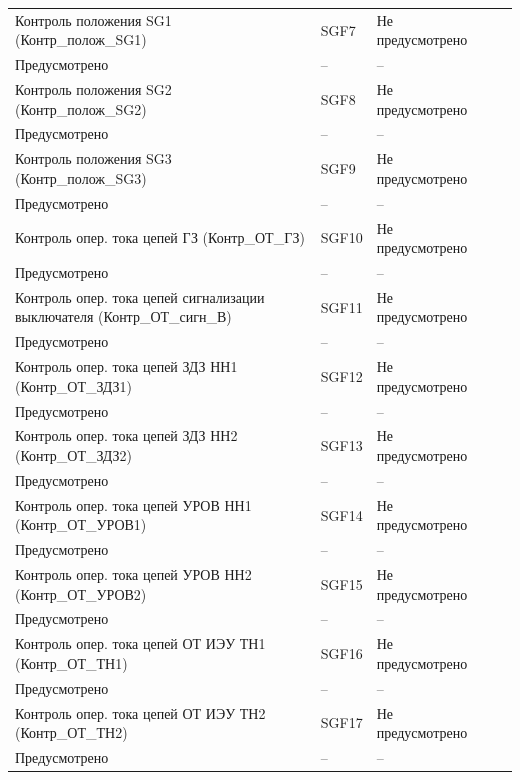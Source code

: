 \begin{longtable}{|>{\centering\arraybackslash}m{5.3cm}|>{\centering\arraybackslash}m{3.3cm}|>{\centering\arraybackslash}m{4.2cm}|>{\centering\arraybackslash}m{1.8cm}|>{\centering\arraybackslash}m{1cm}|}
\hline
\centering Контроль положения SG1 (Контр\_полож\_SG1)  & \centering SGF7 & \centering Не предусмотрено \\ Предусмотрено & \centering -- & \centering \arraybackslash -- \\
\hline
\centering Контроль положения SG2 (Контр\_полож\_SG2)  & \centering SGF8 & \centering Не предусмотрено \\ Предусмотрено & \centering -- & \centering \arraybackslash -- \\
\hline
\centering Контроль положения SG3 (Контр\_полож\_SG3)  & \centering SGF9 & \centering Не предусмотрено \\ Предусмотрено & \centering -- & \centering \arraybackslash -- \\
\hline
\centering Контроль опер. тока цепей ГЗ (Контр\_ОТ\_ГЗ)  & \centering SGF10 & \centering Не предусмотрено \\ Предусмотрено & \centering -- & \centering \arraybackslash -- \\
\hline
\centering Контроль опер. тока цепей сигнализации выключателя (Контр\_ОТ\_сигн\_В)  & \centering SGF11 & \centering Не предусмотрено \\ Предусмотрено & \centering -- & \centering \arraybackslash -- \\
\hline
\centering Контроль опер. тока цепей ЗДЗ НН1 (Контр\_ОТ\_ЗДЗ1)  & \centering SGF12 & \centering Не предусмотрено \\ Предусмотрено & \centering -- & \centering \arraybackslash -- \\
\hline
\centering Контроль опер. тока цепей ЗДЗ НН2 (Контр\_ОТ\_ЗДЗ2)  & \centering SGF13 & \centering Не предусмотрено \\ Предусмотрено & \centering -- & \centering \arraybackslash -- \\
\hline
\centering Контроль опер. тока цепей УРОВ НН1 (Контр\_ОТ\_УРОВ1)  & \centering SGF14 & \centering Не предусмотрено \\ Предусмотрено & \centering -- & \centering \arraybackslash -- \\
\hline
\centering Контроль опер. тока цепей УРОВ НН2 (Контр\_ОТ\_УРОВ2)  & \centering SGF15 & \centering Не предусмотрено \\ Предусмотрено & \centering -- & \centering \arraybackslash -- \\
\hline
\centering Контроль опер. тока цепей ОТ ИЭУ ТН1 (Контр\_ОТ\_ТН1)  & \centering SGF16 & \centering Не предусмотрено \\ Предусмотрено & \centering -- & \centering \arraybackslash -- \\
\hline
\centering Контроль опер. тока цепей ОТ ИЭУ ТН2 (Контр\_ОТ\_ТН2)  & \centering SGF17 & \centering Не предусмотрено \\ Предусмотрено & \centering -- & \centering \arraybackslash -- \\
\hline
\end{longtable}
\normalsize